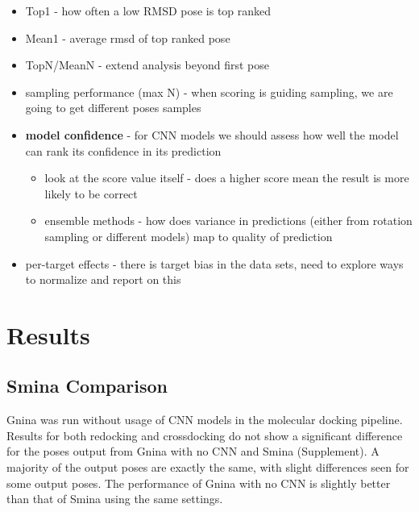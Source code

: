\documentclass[journal=jcisd8,manuscript=article]{achemso}
\begin{document}
\begin{itemize}
    \item Top1 - how often a low RMSD pose is top ranked
    \item Mean1 - average rmsd of top ranked pose
    \item TopN/MeanN - extend analysis beyond first pose
    \item sampling performance (max N) - when scoring is guiding sampling, we are going to get different poses samples
    \item \textbf{model confidence} - for CNN models we should assess how well the model can rank its confidence in its prediction
    \begin{itemize}
        \item look at the score value itself - does a higher score mean the result is more likely to be correct
        \item ensemble methods - how does variance in predictions (either from rotation sampling or different models) map to quality of prediction
    \end{itemize}
    \item per-target effects - there is target bias in the data sets, need to explore ways to normalize and report on this
\end{itemize}


\section{Results}
\subsection{Smina Comparison}
Gnina was run without usage of CNN models in the molecular docking pipeline. Results for both redocking and crossdocking do not show a significant difference for the poses output from Gnina with no CNN and Smina (Supplement). A majority of the output poses are exactly the same, with slight differences seen for some output poses. The performance of Gnina with no CNN is slightly better than that of Smina using the same settings.
\end{document}
